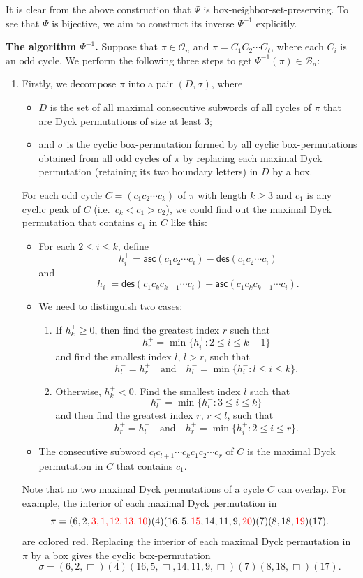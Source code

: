 \documentclass[12pt]{amsart}
\numberwithin{equation}{section}
\def\red{\textcolor{red}}
\theoremstyle{plain}
\theoremstyle{definition}
\newcommand{\B}{\mathcal{B}}
\newcommand{\Od}{\mathcal{O}}
\def\des{\mathsf{des}}
\def\asc{\mathsf{asc}}
\begin{document}
 It is clear from the above construction that $\Psi$ is box-neighbor-set-preserving. To see that $\Psi$ is bijective, we aim to construct its inverse $\Psi^{-1}$ explicitly. 
 
 {\bf The algorithm $\Psi^{-1}$.} Suppose that  $\pi\in\Od_n$ and $\pi=C_1C_2\cdots C_{\ell}$, where each $C_i$ is an odd cycle. We perform the following three steps to get $\Psi^{-1}(\pi)\in\B_n$:
 \begin{enumerate}
 \item[(I)] Firstly, we  decompose $\pi$ into a pair $(D,\sigma)$, where 
\begin{itemize}
\item $D$ is the set of all maximal consecutive subwords of all cycles of $\pi$ that are Dyck permutations of size at least $3$;
\item and $\sigma$ is the cyclic box-permutation formed by all cyclic box-permutations obtained from  all odd cycles of $\pi$ by replacing each maximal Dyck permutation (retaining its two boundary letters)  in $D$ by a box.
\end{itemize}  
For each odd cycle $C=(c_1c_2\cdots c_k)$ of $\pi$ with length $k\geq3$ and $c_1$ is any cyclic peak of $C$ (i.e.~$c_k<c_1>c_2$),  we could find out the maximal Dyck permutation that contains $c_1$ in $C$ like this: 
\begin{itemize}
\item For each $2\leq i\leq k$, define 
$$h_i^+=\asc(c_1c_2\cdots c_i)-\des(c_1c_2\cdots c_i)$$
and
$$h_i^-=\des(c_1c_{k}c_{k-1}\cdots c_{i})-\asc(c_1c_{k}c_{k-1}\cdots c_{i}).$$ 
\item We need to distinguish two cases:
\begin{enumerate}
\item If $h_k^+\geq0$, then find the greatest index $r$ such that 
$$h_r^+=\min\{h_{i}^+: 2\leq i\leq k-1\}$$ and find the smallest index $l$, $l>r$, such that 
$$h_l^-=h_r^+\quad\text{and} \quad h_l^-=\min\{h_{i}^-: l\leq i\leq k\}.$$
\item Otherwise, $h_k^+<0$. Find the smallest index $l$ such that 
$$h_l^-=\min\{h_{i}^-: 3\leq i\leq k\}$$
 and then find the greatest index $r$, $r<l$, such that 
$$h_r^+=h_l^-\quad\text{and} \quad h_r^+=\min\{h_{i}^+: 2\leq i\leq r\}.$$
\end{enumerate}
\item The consecutive subword $c_lc_{l+1}\cdots c_kc_1 c_2\cdots c_r$ of $C$ is the maximal Dyck permutation in $C$  that contains $c_1$.
\end{itemize}
Note that no two maximal Dyck permutations of a cycle $C$ can overlap. For example,  the interior of each maximal Dyck permutation in
 $$
\pi=(6,2,\red{3,1,12,13,10})(4)(16,5,\red{15},14,11,9,\red{20})(7)(8,18,\red{19})(17). 
 $$
 are colored red. Replacing the interior of each maximal Dyck permutation in $\pi$ by a box gives the cyclic box-permutation
 $$
 \sigma=(6,2,\Box)(4)(16,5,\Box,14,11,9,\Box)(7)(8,18,\Box)(17).
 $$


\end{enumerate}
\end{document}
